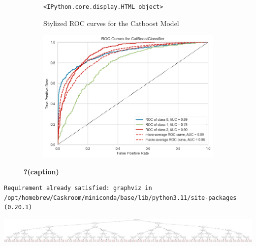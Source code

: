 \documentclass[
  letterpaper,
  DIV=11,
  numbers=noendperiod]{scrartcl}
\begin{document}
\begin{figure}

{\centering 

\begin{figure}

{\centering 

\begin{verbatim}
<IPython.core.display.HTML object>
\end{verbatim}

}

\caption{Stylized ROC curves for the Catboost Model}

\end{figure}

\begin{figure}

{\centering \includegraphics{report_AzadhdhinNedalYunisAlFraijat_files/figure-pdf/fig-rocauc-output-2.png}

}

\end{figure}

}

\caption{\label{fig-rocauc}\textbf{?(caption)}}

\end{figure}

\begin{verbatim}
Requirement already satisfied: graphviz in /opt/homebrew/Caskroom/miniconda/base/lib/python3.11/site-packages (0.20.1)
\end{verbatim}

\includegraphics{report_AzadhdhinNedalYunisAlFraijat_files/mediabag/report_AzadhdhinNedalYunisAlFraijat_files/figure-pdf/cell-55-output-1.pdf}
\end{document}

